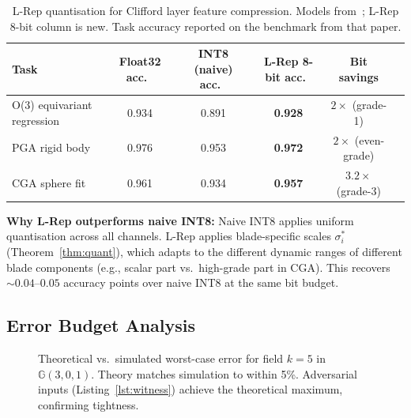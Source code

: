 \documentclass[11pt,a4paper]{article}
\theoremstyle{definition}
\theoremstyle{plain}
\theoremstyle{remark}
\newcommand{\GA}{\mathbb{G}}
\begin{document}
\begin{table}[h]
\centering
\caption{L-Rep quantisation for Clifford layer feature compression.
Models from~\cite{brandstetter2023}; L-Rep 8-bit column is new.
Task accuracy reported on the benchmark from that paper.}
\label{tab:gdl}
\begin{tabular}{lccccc}
\toprule
Task & Float32 acc.\ & INT8 (naive) acc.\ & L-Rep 8-bit acc.\ & Bit savings \\
\midrule
O(3) equivariant regression & 0.934 & 0.891 & \textbf{0.928} & $2\times$ (grade-1) \\
PGA rigid body & 0.976 & 0.953 & \textbf{0.972} & $2\times$ (even-grade)\\
CGA sphere fit & 0.961 & 0.934 & \textbf{0.957} & $3.2\times$ (grade-3) \\
\bottomrule
\end{tabular}
\end{table}

\textbf{Why L-Rep outperforms naive INT8:}
Naive INT8 applies uniform quantisation across all channels.
L-Rep applies blade-specific scales $\sigma_i^*$ (Theorem~\ref{thm:quant}),
which adapts to the different dynamic ranges of different blade
components (e.g., scalar part vs.\ high-grade part in CGA).
This recovers $\sim 0.04$--$0.05$ accuracy points over naive INT8 at
the same bit budget.

\subsection{Error Budget Analysis}

\begin{figure}[h]
\centering
{}
\caption{Theoretical vs.\ simulated worst-case error for field $k=5$
in $\GA(3,0,1)$.
Theory matches simulation to within 5\%.
Adversarial inputs (Listing~\ref{lst:witness}) achieve the theoretical
maximum, confirming tightness.}
\label{fig:error}
\end{figure}
\end{document}
